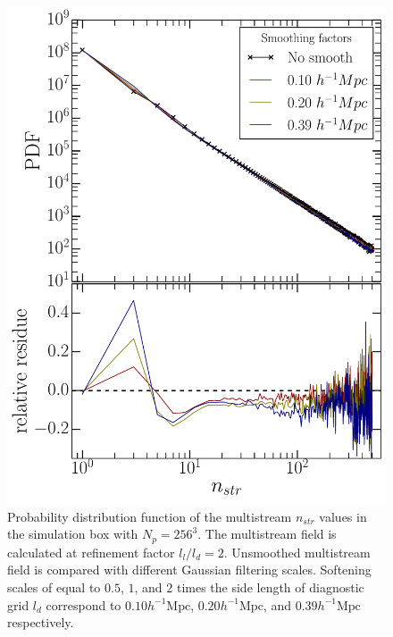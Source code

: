 \begin{figure}
\begin{minipage}[t]{.99\linewidth}
  \centering\includegraphics[width=10.cm]{Chapter4/Source_v2/fig10.pdf} 

\end{minipage}\hfill
\caption{Probability distribution function of the multistream $n_{str}$ values in the simulation box with $N_p = 256^3$. The multistream field is calculated at refinement factor $l_l/l_d= 2$. Unsmoothed multistream field is compared with different Gaussian filtering scales. Softening scales of equal to $0.5$, $1$, and $2$ times the side length of diagnostic grid $l_d$ correspond to $0.10 h^{-1} \text{Mpc}$, $0.20 h^{-1} \text{Mpc}$, and $0.39 h^{-1} \text{Mpc}$ respectively.}
\label{fig:nstrSmooth}
\end{figure}

